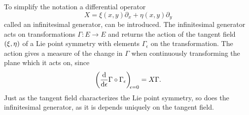 To simplify the notation a differential operator
\begin{equation}
  X = \xi(x,y) \partial_x + \eta(x,y) \partial_y
\end{equation}
called an infinitesimal generator, can be introduced.
The infinitesimal generator acts on transformations \(\Gamma: E \to E\) and returns the action of the tangent field \(\qty(\xi, \eta)\) of a Lie point symmetry with elements \(\Gamma_\epsilon\) on the transformation.
The action gives a measure of the change in \(\Gamma\) when continuously transforming the plane which it acts on, since
\begin{equation}
  \diff*{\Gamma \circ \Gamma_\epsilon}{\epsilon}[\epsilon = 0] = X \Gamma.
\end{equation}
Just as the tangent field characterizes the Lie point symmetry, so does the infinitesimal generator, as it is depends uniquely on the tangent field.


